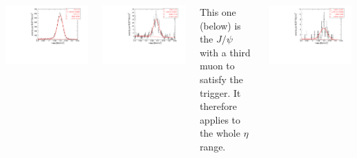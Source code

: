 \documentclass[compress]{beamer}
\begin{document}
\begin{frame}
\begin{columns}
\includegraphics[width=\linewidth]{respeak_jpsi.pdf}

\includegraphics[width=\linewidth]{respeak_psiprime.pdf}

This one (below) is the $J/\psi$ with a third muon to satisfy the trigger.  It
therefore applies to the whole $\eta$ range.

\includegraphics[width=\linewidth]{respeak_jpsi2.pdf}
\end{columns}
\end{frame}
\end{document}
